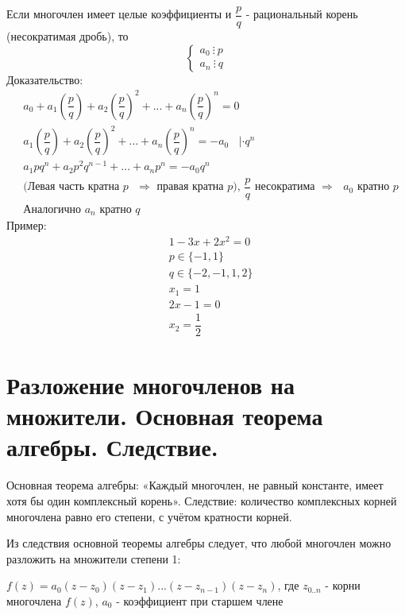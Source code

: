 \documentclass[12pt]{article}
\begin{document}
\begin{sloppypar}
    Если многочлен имеет целые коэффициенты и $\dfrac{p}{q}$ - рациональный корень (несократимая дробь), то
    \[
        \begin{cases}
            a_0\ \vdots\ p \\
            a_n\ \vdots\ q
        \end{cases}
    \]
    Доказательство:
    \begin{align*}
         & a_0 + a_1(\dfrac{p}{q}) + a_2(\dfrac{p}{q})^2 + ... + a_n (\dfrac{p}{q})^n = 0                                             \\
         & a_1(\dfrac{p}{q}) + a_2(\dfrac{p}{q})^2 + ... + a_n (\dfrac{p}{q})^n = -a_0 \ \ \ \ |\cdot q^n                             \\
         & a_1pq^n + a_2p^2q^{n - 1} + ... + a_n p^n = -a_0q^n                                                                        \\
         & \text{(Левая часть кратна $p$ $\Rightarrow$ правая кратна $p$), $\dfrac{p}{q}$ несократима $\Rightarrow$ $a_0$ кратно $p$} \\
         & \text{Аналогично $a_n$ кратно $q$}
    \end{align*}
    Пример:
    \begin{align*}
         & 1 - 3x + 2x^2 = 0      \\
         & p \in \{-1, 1\}        \\
         & q \in \{-2, -1, 1, 2\} \\
         & x_1 = 1                \\
         & 2x - 1 = 0             \\
         & x_2 =  \dfrac{1}{2}
    \end{align*}

    \section{Разложение многочленов на множители. Основная теорема алгебры. Следствие.}
    Основная теорема алгебры: «Каждый многочлен, не равный константе, имеет хотя бы один комплексный корень».
    Следствие: количество комплексных корней многочлена равно его степени, с учётом кратности корней.

    Из следствия основной теоремы алгебры следует, что любой многочлен можно разложить на множители степени 1:

    $f(z) = a_0(z - z_0)(z - z_1)...(z - z_{n-1})(z - z_n)$, где $z_{0..n}$ - корни многочлена $f(z)$, $a_0$ - коэффициент при старшем члене


\end{sloppypar}
\end{document}
